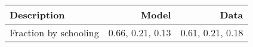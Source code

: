 \begin{tabular}{lrr}
\hline
Description & Model  & Data  \\ 
\hline
Fraction by schooling & 0.66, 0.21, 0.13  & 0.61, 0.21, 0.18  \\ 
\hline
\end{tabular}%
